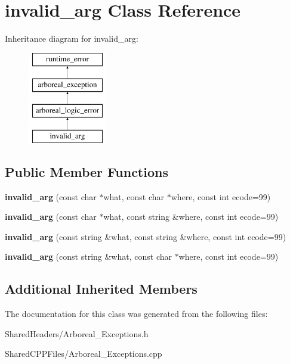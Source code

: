 \hypertarget{classinvalid__arg}{}\section{invalid\+\_\+arg Class Reference}
\label{classinvalid__arg}
Inheritance diagram for invalid\+\_\+arg\+:\begin{figure}[H]
\begin{center}
\leavevmode
\includegraphics[height=4.000000cm]{classinvalid__arg}
\end{center}
\end{figure}
\subsection*{Public Member Functions}
\begin{DoxyCompactItemize}
\item 
\mbox{\label{classinvalid__arg_ab470c1e208290687c57ddb80ad7c91bf}} 
{\bfseries invalid\+\_\+arg} (const char $\ast$what, const char $\ast$where, const int ecode=99)
\item 
\mbox{\label{classinvalid__arg_ac64346933956c640dc48166d3c11ea6d}} 
{\bfseries invalid\+\_\+arg} (const char $\ast$what, const string \&where, const int ecode=99)
\item 
\mbox{\label{classinvalid__arg_afd1c07ada97de63dd8b2bf8d19753649}} 
{\bfseries invalid\+\_\+arg} (const string \&what, const string \&where, const int ecode=99)
\item 
\mbox{\label{classinvalid__arg_a1b68c46a8c2ddc202eb89edf05667618}} 
{\bfseries invalid\+\_\+arg} (const string \&what, const char $\ast$where, const int ecode=99)
\end{DoxyCompactItemize}
\subsection*{Additional Inherited Members}


The documentation for this class was generated from the following files\+:\begin{DoxyCompactItemize}
\item 
Shared\+Headers/Arboreal\+\_\+\+Exceptions.\+h\item 
Shared\+C\+P\+P\+Files/Arboreal\+\_\+\+Exceptions.\+cpp\end{DoxyCompactItemize}
